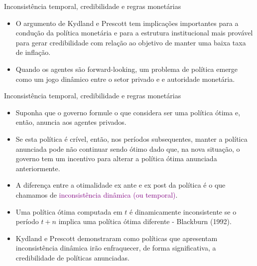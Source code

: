 \documentclass[10pt]{beamer}
\begin{document}
\begin{frame}{Inconsistência temporal, credibilidade e regras monetárias}
    \begin{itemize}
        \item O argumento de Kydland e Prescott tem implicações importantes para a condução da política monetária e para a estrutura institucional mais provável para gerar credibilidade com relação ao objetivo de manter uma baixa taxa de inflação.
        \bigskip
        \item Quando os agentes são forward-looking, um problema de política emerge como um jogo dinâmico entre o setor privado e e autoridade monetária.
    \end{itemize}
\end{frame}

\begin{frame}{Inconsistência temporal, credibilidade e regras monetárias}
    \begin{itemize}
        \item Suponha que o governo formule o que considera ser uma política ótima e, então, anuncia aos agentes privados.
        \bigskip
        \item Se esta política é crível, então, nos períodos subsequentes, manter a política anunciada pode não continuar sendo ótimo dado que, na nova situação, o governo tem um incentivo para alterar a política ótima anunciada anteriormente.
        \bigskip
        \item A diferença entre a otimalidade ex ante e ex post da política é o que chamamos de \textcolor{purple}{inconsistência dinâmica (ou temporal)}.
        \bigskip
        \item Uma política ótima computada em $t$ é dinamicamente inconsistente se o período $t + n$ implica uma política ótima diferente - Blackburn (1992).
        \bigskip
        \item Kydland e Prescott demonstraram como políticas que apresentam inconsistência dinâmica irão enfraquecer, de forma significativa, a credibilidade de políticas anunciadas.
    \end{itemize}
\end{frame}
\end{document}
